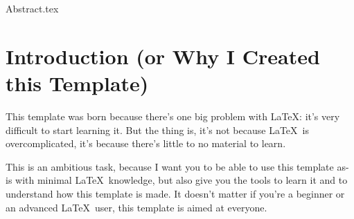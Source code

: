 \documentclass{article}
\begin{document}
  \begin{titlepage}
    \centering
    \vspace*{2cm}
    \titleblock [2cm]
    \vspace{1cm}  %
    \authorblock
    \vfill  %
    \location \\
    \dateblock \\
    \footnotesize { \texttt{\fullversion} }
  \end{titlepage}

  {Abstract.tex}
  \newpage
  \tableofcontents
  \newpage
  \section{Introduction (or Why I Created this Template)}
    This template was born because there's one big problem with \LaTeX: it's very difficult to start
    learning it.
    But the thing is, it's not because \LaTeX\ is overcomplicated, it's because there's little to no
    material to learn.

    This is an ambitious task, because I want you to be able to use this template as-is with minimal
    \LaTeX\ knowledge, but also give you the tools to learn it and to understand how this template is
    made.
    It doesn't matter if you're a beginner or an advanced \LaTeX\ user, this template is aimed at 
    everyone.
\end{document}
